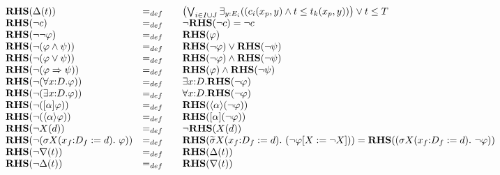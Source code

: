\documentclass{article}
\begin{document}
\begin{equation*}
\begin{array}{lll}
{\mathbf{RHS}}(\Delta (t)) & =_{def} & \left( \bigvee_{i{\in }I\cup
J}\exists _{y{:}E_{i}}((c_{i}(x_{p},y)\wedge t\leq t_{k}(x_{p},y))\right)
\vee t\leq T \\
{\mathbf{RHS}}(\lnot c) & =_{def} & \lnot {\mathbf{RHS}}(\lnot c)=\lnot c \\
{\mathbf{RHS}}(\lnot \lnot \varphi ) & =_{def} & \mathbf{RHS}(\varphi ) \\
{\mathbf{RHS}}(\lnot (\varphi \wedge \psi )) & =_{def} & {\mathbf{RHS}}%
(\lnot \varphi )\vee {\mathbf{RHS}}(\lnot \psi ) \\
{\mathbf{RHS}}(\lnot (\varphi \vee \psi )) & =_{def} & {\mathbf{RHS}}(\lnot
\varphi )\wedge {\mathbf{RHS}}(\lnot \psi ) \\
{\mathbf{RHS}}(\lnot (\varphi \Rightarrow \psi )) & =_{def} & {\mathbf{RHS}}%
(\varphi )\wedge {\mathbf{RHS}}(\lnot \psi ) \\
{\mathbf{RHS}}(\lnot (\forall {x{:}D}.\varphi )) & =_{def} & \exists {x{:}D}.%
{\mathbf{RHS}}(\lnot \varphi ) \\
{\mathbf{RHS}}(\lnot (\exists {x{:}D}.\varphi )) & =_{def} & \forall {x{:}D}.%
{\mathbf{RHS}}(\lnot \varphi ) \\
{\mathbf{RHS}}(\lnot ([\alpha ]\varphi )) & =_{def} & {\mathbf{RHS}}(\langle
\alpha \rangle (\lnot \varphi )) \\
{\mathbf{RHS}}(\lnot (\langle \alpha \rangle \varphi )) & =_{def} & {\mathbf{%
RHS}}([\alpha ](\lnot \varphi )) \\
{\mathbf{RHS}}(\lnot X(d)) & =_{def} & \lnot {\mathbf{RHS}}(X(d)) \\
{\mathbf{RHS}}(\lnot (\sigma X(x_{f}{:}D_{f}:=d).~\varphi )) & =_{def}~~~ & {%
\mathbf{RHS}}(\widetilde{\sigma }X(x_{f}{:}D_{f}:=d).~(\lnot \varphi \lbrack
X:=\lnot X]))={\mathbf{RHS}}((\sigma X(x_{f}{:}D_{f}:=d).~\lnot \varphi ))
\\
{\mathbf{RHS}}(\lnot \nabla (t)) & =_{def} & {\mathbf{RHS}}(\Delta (t)) \\
{\mathbf{RHS}}(\lnot \Delta (t)) & =_{def} & {\mathbf{RHS}}(\nabla (t))%
\end{array}%
\end{equation*}

\pagebreak
\end{document}
